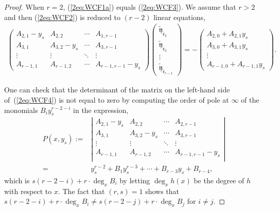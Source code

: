 \documentclass[10pt,a4paper]{amsart}
\def\tfy{{\widetilde{\mathfrak y}}}
\def\Bfe{{\overline{\mathfrak e}}}
\numberwithin{equation}{section}
\begin{document}
\begin{proof}
When $r = 2$, (\ref{2eq:WCF1a}) equals (\ref{2eq:WCF3}).
We assume that $r>2$ and then (\ref{2eq:WCF2}) is reduced to $(r-2)$ linear equations,
\begin{gather}
\begin{pmatrix}
A_{2,1} - y_s & A_{2,2} & \cdots & A_{1,r-1}\\
A_{3,1} & A_{3,2} - y_s& \cdots & A_{3,r-1}\\
\vdots & \vdots & \ddots & \vdots \\
A_{r-1,1} & A_{r-1,2} & \cdots & A_{r-1,r-1} - y_s
\end{pmatrix}
\begin{pmatrix}
\tfy_{\Bfe_2}\\
\tfy_{\Bfe_3}\\
\vdots\\
\tfy_{\Bfe_{r-1}}
\end{pmatrix}
=-
\begin{pmatrix}
A_{2,0} + A_{2, 1} y_s\\
A_{3,0} + A_{3, 1} y_s\\
\vdots\\
A_{r-1,0} + A_{r-1, 1} y_s
\end{pmatrix}.\label{2eq:WCF4}
\end{gather}

One can check that the determinant of the matrix on the left-hand side of~(\ref{2eq:WCF4}) is not equal to zero by computing the order of pole at $\infty$ of
the monomials $B_{i} y_s^{r-2-i}$ in the expression,
\begin{align*}
P(x, y_s):={}& \left|
\begin{matrix}
A_{2,1} - y_s & A_{2,2} & \cdots & A_{2,r-1}\\
A_{3,1} & A_{3,2} - y_s& \cdots & A_{3,r-1}\\
\vdots & \vdots & \ddots & \vdots \\
A_{r-1,1} & A_{r-1,2} & \cdots & A_{r-1,r-1} - y_s\\
\end{matrix}
\right|\\
={}& y_s^{r-2} + B_1 y_s^{r-3} +\cdots
+ B_{r-3} y_s + B_{r-4},
\end{align*}
which is $s (r -2 -i) + r \cdot\deg_x B_i$ by letting $\deg_x h(x)$ be the degree of $h$ with respect to $x$.
The fact that $(r,s)=1$ shows that $s (r -2 -i) + r \cdot\deg_x B_i\neq s (r -2 -j) + r \cdot\deg_x B_j$ for $i\neq j$.


\end{proof}
\end{document}
